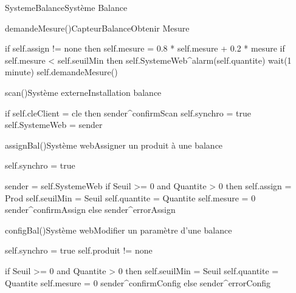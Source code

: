 \begin{OM}{SystemeBalance}{Système Balance}
    \begin{OMOperation}{demandeMesure()}{CapteurBalance}{Obtenir Mesure}
        \begin{OMMessages}
        \end{OMMessages}
        \OMNoPre
        \begin{OMPost}
if self.assign != none then
    self.mesure = 0.8 * self.mesure + 0.2 * mesure
    if self.mesure < self.seuilMin then
        self.SystemeWeb^alarm(self.quantite)
wait(1 minute)
self.demandeMesure()
        \end{OMPost}
    \end{OMOperation}

    \begin{OMOperation}{scan()}{Système externe}{Installation balance}
        \begin{OMMessages}
        \end{OMMessages}
        \OMNoPre
        \begin{OMPost}
if self.cleClient = cle then
    sender^confirmScan
    self.synchro = true
    self.SystemeWeb = sender
        \end{OMPost}
    \end{OMOperation}

    \begin{OMOperation}{assignBal()}{Système web}{Assigner un produit à une balance}
        \begin{OMMessages}
        \end{OMMessages}
        \begin{OMPre}
self.synchro = true
        \end{OMPre}
        \begin{OMPost}
sender = self.SystemeWeb
if Seuil >= 0 and Quantite > 0 then
    self.assign = Prod
    self.seuilMin = Seuil
    self.quantite = Quantite
    self.mesure = 0
    sender^confirmAssign
else
    sender^errorAssign
        \end{OMPost}
    \end{OMOperation}

    \begin{OMOperation}{configBal()}{Système web}{Modifier un paramètre d'une balance}
        \begin{OMMessages}
        \end{OMMessages}
        \begin{OMPre}
self.synchro = true
self.produit != none
        \end{OMPre}
        \begin{OMPost}
if Seuil >= 0 and Quantite > 0 then
    self.seuilMin = Seuil
    self.quantite = Quantite
    self.mesure = 0
    sender^confirmConfig
else
    sender^errorConfig
\end{OMPost}
    \end{OMOperation}
\end{OM}

